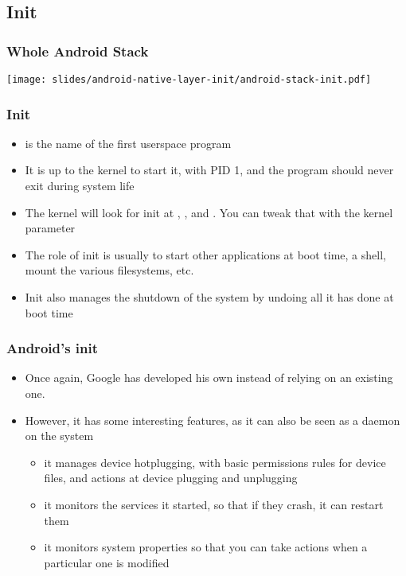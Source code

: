 \subsection{Init}

\begin{frame}
  \frametitle{Whole Android Stack}
  \begin{center}
    \texttt{[image: slides/android-native-layer-init/android-stack-init.pdf]}
  \end{center}
\end{frame}

\begin{frame}
  \frametitle{Init}
  \begin{itemize}
  \item {} is the name of the first userspace program
  \item It is up to the kernel to start it, with PID 1, and the
    program should never exit during system life
  \item The kernel will look for init at ,
    ,  and . You can
    tweak that with the  kernel parameter
  \item The role of init is usually to start other applications at
    boot time, a shell, mount the various filesystems, etc.
  \item Init also manages the shutdown of the system by undoing all it
    has done at boot time
  \end{itemize}
\end{frame}

\begin{frame}
  \frametitle{Android's init}
  \begin{itemize}
  \item Once again, Google has developed his own instead of relying on
    an existing one.
  \item However, it has some interesting features, as it can also be
    seen as a daemon on the system
    \begin{itemize}
    \item it manages device hotplugging, with basic
      permissions rules for device files, and actions at device plugging
      and unplugging
    \item it monitors the services it started, so that if they crash,
      it can restart them
    \item it monitors system properties so that you can take
      actions when a particular one is modified
    \end{itemize}
  \end{itemize}
\end{frame}

